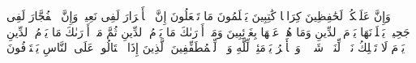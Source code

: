 \stopbuffer%
\startbuffer[\q:82:10]
وَإِنَّ عَلَیۡكُمۡ لَحَٰفِظِینَ%
\stopbuffer%
\startbuffer[\q:82:11]
كِرَامࣰا كَٰتِبِینَ%
\stopbuffer%
\startbuffer[\q:82:12]
یَعۡلَمُونَ مَا تَفۡعَلُونَ%
\stopbuffer%
\startbuffer[\q:82:13]
إِنَّ ٱلۡأَبۡرَارَ لَفِی نَعِیمࣲ%
\stopbuffer%
\startbuffer[\q:82:14]
وَإِنَّ ٱلۡفُجَّارَ لَفِی جَحِیمࣲ%
\stopbuffer%
\startbuffer[\q:82:15]
یَصۡلَوۡنَهَا یَوۡمَ ٱلدِّینِ%
\stopbuffer%
\startbuffer[\q:82:16]
وَمَا هُمۡ عَنۡهَا بِغَاۤئِبِینَ%
\stopbuffer%
\startbuffer[\q:82:17]
وَمَاۤ أَدۡرَىٰكَ مَا یَوۡمُ ٱلدِّینِ%
\stopbuffer%
\startbuffer[\q:82:18]
ثُمَّ مَاۤ أَدۡرَىٰكَ مَا یَوۡمُ ٱلدِّینِ%
\stopbuffer%
\startbuffer[\q:82:19]
یَوۡمَ لَا تَمۡلِكُ نَفۡسࣱ لِّنَفۡسࣲ شَیۡءࣰاۖ وَٱلۡأَمۡرُ یَوۡمَئِذࣲ لِّلَّهِ%
\stopbuffer%
\startbuffer[\q:83:1]
وَیۡلࣱ لِّلۡمُطَفِّفِینَ%
\stopbuffer%
\startbuffer[\q:83:2]
ٱلَّذِینَ إِذَا ٱكۡتَالُوا۟ عَلَى ٱلنَّاسِ یَسۡتَوۡفُونَ%
\stopbuffer%
